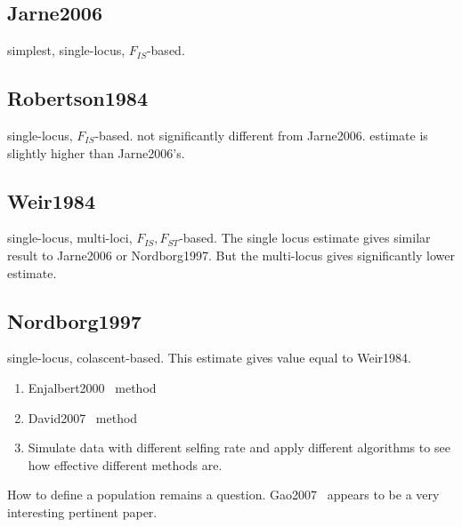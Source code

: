 \documentclass[a4paper,10pt]{article}
\begin{document}
\subsection{Jarne2006~\cite{Jarne2006}}
simplest, single-locus, $F_{IS}$-based.

\subsection{Robertson1984~\cite{Robertson1984}}
single-locus, $F_{IS}$-based. not significantly different from Jarne2006. estimate is slightly higher than Jarne2006's.

\subsection{Weir1984~\cite{Weir1984}}
single-locus, multi-loci, $F_{IS},F_{ST}$-based. The single locus estimate gives similar result to Jarne2006 or Nordborg1997. But the multi-locus gives significantly lower estimate.

\subsection{Nordborg1997~\cite{Nordborg1997}}
single-locus, colascent-based. This estimate gives value equal to Weir1984.

\begin{enumerate}
 \item Enjalbert2000~\cite{Enjalbert2000} method
 \item David2007~\cite{David2007} method
 \item Simulate data with different selfing rate and apply different algorithms to see how effective different methods are.
\end{enumerate}

How to define a population remains a question. Gao2007~\cite{Gao2007} appears to be a very interesting pertinent paper.



\end{document}
